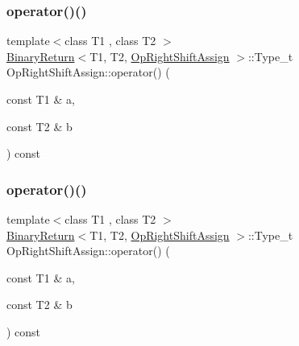 \subsubsection{\texorpdfstring{operator()()}{operator()()}\hspace{0.1cm}{\footnotesize\ttfamily [1/3]}}
{\footnotesize\ttfamily template$<$class T1 , class T2 $>$ \\
\mbox{\hyperlink{structBinaryReturn}{Binary\+Return}}$<$T1, T2, \mbox{\hyperlink{structOpRightShiftAssign}{Op\+Right\+Shift\+Assign}} $>$\+::Type\+\_\+t Op\+Right\+Shift\+Assign\+::operator() (\begin{DoxyParamCaption}\item[{const T1 \&}]{a,  }\item[{const T2 \&}]{b }\end{DoxyParamCaption}) const\hspace{0.3cm}{\ttfamily [inline]}}

\mbox{\label{structOpRightShiftAssign_aadcc045ee32dcfceb41c254bec68ef3c}} 
\subsubsection{\texorpdfstring{operator()()}{operator()()}\hspace{0.1cm}{\footnotesize\ttfamily [2/3]}}
{\footnotesize\ttfamily template$<$class T1 , class T2 $>$ \\
\mbox{\hyperlink{structBinaryReturn}{Binary\+Return}}$<$T1, T2, \mbox{\hyperlink{structOpRightShiftAssign}{Op\+Right\+Shift\+Assign}} $>$\+::Type\+\_\+t Op\+Right\+Shift\+Assign\+::operator() (\begin{DoxyParamCaption}\item[{const T1 \&}]{a,  }\item[{const T2 \&}]{b }\end{DoxyParamCaption}) const\hspace{0.3cm}{\ttfamily [inline]}}

\mbox{\label{structOpRightShiftAssign_aadcc045ee32dcfceb41c254bec68ef3c}} 
